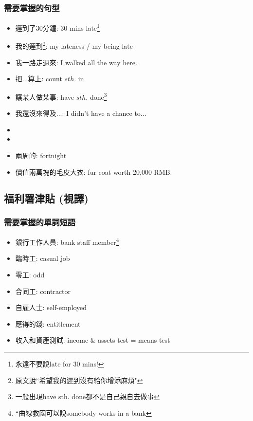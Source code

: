 \subsubsection*{需要掌握的句型}
\begin{multicols}{2}
\begin{itemize}
  \itemsep0em
  \item 遲到了30分鐘: 30 mins late\footnote{永遠不要說late for 30 mins!}
  \item 我的遲到\footnote{原文說``希望我的遲到沒有給你增添麻煩"}: my lateness / my being late
  \item 我一路走過來: I walked all the way here.
  \item 把...算上: count $sth.$ in
  \item 讓某人做某事: have $sth.$ done\footnote{一般出現have sth. done都不是自己親自去做事}
  \item 我還沒來得及...: I didn't have a chance to...
  \item {}
  \item {}
  \item 兩周的: fortnight
  \item 價值兩萬塊的毛皮大衣: fur coat worth 20,000 RMB.
\end{itemize}
\end{multicols}

\subsection{福利署津貼 (視譯)}
\subsubsection*{需要掌握的單詞短語}
\begin{multicols}{2}
\begin{itemize}
  \itemsep0em
  \item 銀行工作人員: bank staff member\footnote{``曲線救國可以說somebody works in a bank}
  \item 臨時工: casual job
  \item 零工: odd
  \item 合同工: contractor
  \item 自雇人士: self-employed
  \item 應得的錢: entitlement
  \item 收入和資產測試: income \& assets test = means test
\end{itemize}
\end{multicols}

